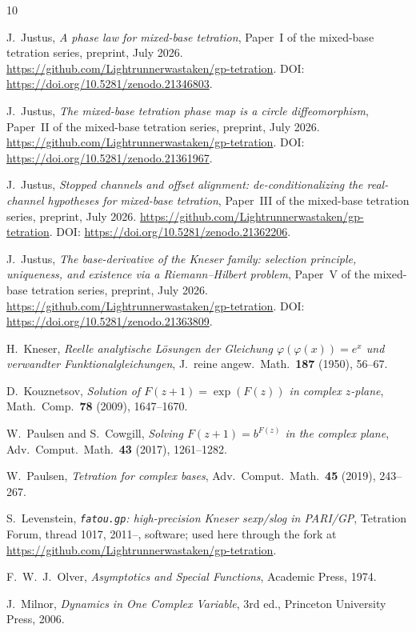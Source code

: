 \documentclass[11pt,a4paper]{article}
\theoremstyle{definition}
\theoremstyle{remark}
\begin{document}
\begin{thebibliography}{10}

J.~Justus,
\emph{A phase law for mixed-base tetration},
Paper~I of the mixed-base tetration series, preprint, July 2026.
\url{https://github.com/Lightrunnerwastaken/gp-tetration}. DOI: \url{https://doi.org/10.5281/zenodo.21346803}.

J.~Justus,
\emph{The mixed-base tetration phase map is a circle diffeomorphism},
Paper~II of the mixed-base tetration series, preprint, July 2026.
\url{https://github.com/Lightrunnerwastaken/gp-tetration}. DOI: \url{https://doi.org/10.5281/zenodo.21361967}.

J.~Justus,
\emph{Stopped channels and offset alignment: de-conditionalizing the real-channel hypotheses for mixed-base tetration},
Paper~III of the mixed-base tetration series, preprint, July 2026.
\url{https://github.com/Lightrunnerwastaken/gp-tetration}. DOI: \url{https://doi.org/10.5281/zenodo.21362206}.

J.~Justus,
\emph{The base-derivative of the Kneser family: selection principle, uniqueness, and existence via a Riemann--Hilbert problem},
Paper~V of the mixed-base tetration series, preprint, July 2026.
\url{https://github.com/Lightrunnerwastaken/gp-tetration}. DOI: \url{https://doi.org/10.5281/zenodo.21363809}.

H.~Kneser,
\emph{Reelle analytische L\"osungen der Gleichung $\varphi(\varphi(x))=e^x$ und verwandter
Funktionalgleichungen},
J.\ reine angew.\ Math.\ \textbf{187} (1950), 56--67.

D.~Kouznetsov,
\emph{Solution of $F(z+1)=\exp(F(z))$ in complex $z$-plane},
Math.\ Comp.\ \textbf{78} (2009), 1647--1670.

W.~Paulsen and S.~Cowgill,
\emph{Solving $F(z+1)=b^{F(z)}$ in the complex plane},
Adv.\ Comput.\ Math.\ \textbf{43} (2017), 1261--1282.

W.~Paulsen,
\emph{Tetration for complex bases},
Adv.\ Comput.\ Math.\ \textbf{45} (2019), 243--267.

S.~Levenstein,
\emph{\texttt{fatou.gp}: high-precision Kneser sexp/slog in PARI/GP},
Tetration Forum, thread 1017, 2011--, software; used here through the fork at
\url{https://github.com/Lightrunnerwastaken/gp-tetration}.

F.~W.~J.~Olver,
\emph{Asymptotics and Special Functions},
Academic Press, 1974.

J.~Milnor,
\emph{Dynamics in One Complex Variable},
3rd ed., Princeton University Press, 2006.

\end{thebibliography}
\end{document}

